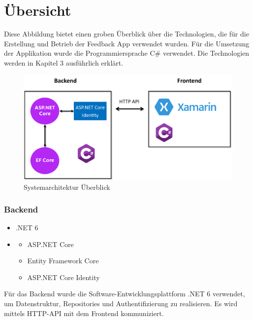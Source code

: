 \section{Übersicht}

Diese Abbildung bietet einen groben Überblick über die Technologien, die für die Erstellung und Betrieb der Feedback App verwendet wurden.
Für die Umsetzung der Applikation wurde die Programmiersprache C\# verwendet. Die Technologien werden in Kapitel 3 ausführlich erklärt.

\begin{figure} [h]
    \begin{center}
        \includegraphics*[width=15cm]{./pics/architecture_overview.png}
        \caption[overview architecture]{Systemarchitektur Überblick \cite{CSharpLogo} \cite{XamarinLogo}}
    \end{center}
\end{figure}

\subsubsection{Backend}
\begin{itemize}
    \item .NET 6
    \item \begin{itemize}
        \item ASP.NET Core
        \item Entity Framework Core
        \item ASP.NET Core Identity
    \end{itemize}
\end{itemize}

Für das Backend wurde die Software-Entwicklungsplattform .NET 6 verwendet, um Datenstruktur, Repositories und Authentifizierung zu realisieren. 
Es wird mittels HTTP-API mit dem Frontend kommuniziert.

